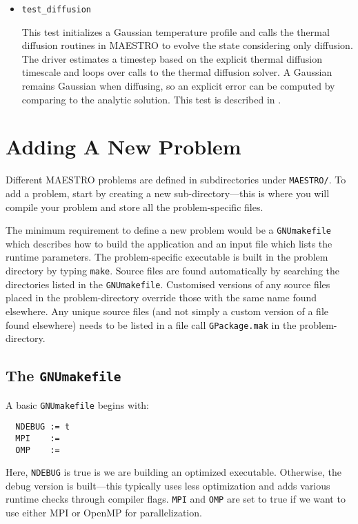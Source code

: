 \begin{itemize}
  
\item {\tt test\_diffusion}

  This test initializes a Gaussian temperature profile and calls
  the thermal diffusion routines in MAESTRO to evolve the state 
  considering only diffusion.  The driver estimates a timestep
  based on the explicit thermal diffusion timescale and loops
  over calls to the thermal diffusion solver.  A Gaussian remains
  Gaussian when diffusing, so an explicit error can be computed
  by comparing to the analytic solution.  This test is 
  described in \cite{xrb}.

\end{itemize}


\section{Adding A New Problem}
\label{sec:adding_problems}

Different MAESTRO problems are defined in subdirectories under
{\tt MAESTRO/}.  To add a problem, start by creating a new
sub-directory---this is where you will compile your problem and
store all the problem-specific files.

The minimum requirement to
define a new problem would be a {\tt GNUmakefile} which describes how
to build the application and an input file which lists the runtime
parameters.  The problem-specific executable is built in the problem
directory by typing {\tt make}.  Source files are found automatically
by searching the directories listed in the {\tt GNUmakefile}.
Customised versions of any source files placed in the problem-directory
override those with the same name found elsewhere.  Any unique
source files (and not simply a custom version of a file found
elsewhere) needs to be listed in a file call {\tt GPackage.mak}
in the problem-directory.

\subsection{The {\tt GNUmakefile}}

\label{sec:makefile}

A basic {\tt GNUmakefile} begins with:
\begin{verbatim}
  NDEBUG := t
  MPI    :=
  OMP    :=
\end{verbatim}
Here, {\tt NDEBUG} is true is we are building an optimized executable.
Otherwise, the debug version is built---this typically uses less
optimization and adds various runtime checks through compiler flags.
{\tt MPI} and {\tt OMP} are set to true if we want to use either MPI
or OpenMP for parallelization.

